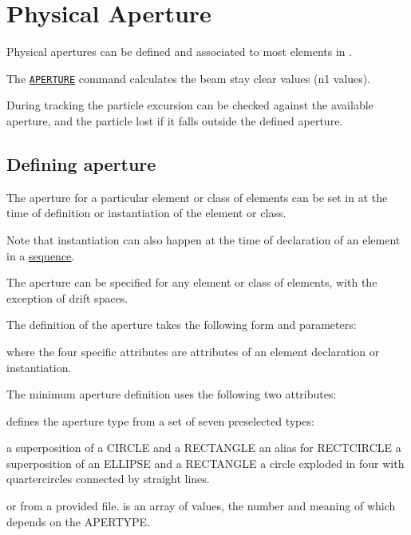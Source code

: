  
\chapter{Physical Aperture}
\label{chap:aperture}

Physical apertures can be defined and associated to most elements 
in \madx. 
 
The \hyperref[sec:aperture]{\tt APERTURE} command calculates 
the beam stay clear values (n1 values). 

During tracking the particle excursion can be checked against the 
available aperture, and the particle lost if it falls outside 
the defined aperture.


\section{Defining aperture}
\label{sec:def_aper}
The aperture for a particular element or class of elements can be 
set in \madx at the time of definition or instantiation of the 
element or class. 

Note that instantiation can also happen at the time of declaration of 
an element in a \hyperref[chap:sequence]{sequence}.  


The aperture can be specified for any element or class of elements, 
with the exception of drift spaces. 

The definition of the aperture takes the following form and parameters:\\

where the four specific  attributes are attributes of an element 
declaration or instantiation. 

The minimum aperture definition uses the following two attributes:


\begin{madlist}
   defines the aperture type from a set of seven
  preselected types:
    \begin{madlist}
       a superposition of a CIRCLE and
        a RECTANGLE 
       an alias for RECTCIRCLE
       a superposition of an ELLIPSE and a
        RECTANGLE
       a circle exploded in four with
      quartercircles connected by straight lines.  
    \end{madlist}
    or from a provided file.
   is an array of values, the number and meaning 
of which depends on the APERTYPE.  
\end{madlist}

